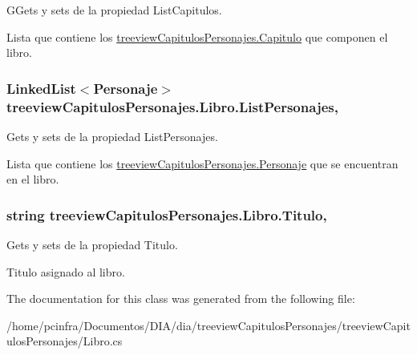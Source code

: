 G\-Gets y sets de la propiedad List\-Capitulos. 

Lista que contiene los \hyperlink{classtreeview_capitulos_personajes_1_1_capitulo}{treeview\-Capitulos\-Personajes.\-Capitulo} que componen el libro. \hypertarget{classtreeview_capitulos_personajes_1_1_libro_a91c18a348c246d5133e9f66df0d81c55}{
\subsubsection[{List\-Personajes}]{\setlength{\rightskip}{0pt plus 5cm}Linked\-List$<${\bf Personaje}$>$ treeview\-Capitulos\-Personajes.\-Libro.\-List\-Personajes\hspace{0.3cm}{\ttfamily [get]}, {\ttfamily [set]}}}\label{classtreeview_capitulos_personajes_1_1_libro_a91c18a348c246d5133e9f66df0d81c55}


Gets y sets de la propiedad List\-Personajes. 

Lista que contiene los \hyperlink{classtreeview_capitulos_personajes_1_1_personaje}{treeview\-Capitulos\-Personajes.\-Personaje} que se encuentran en el libro. \hypertarget{classtreeview_capitulos_personajes_1_1_libro_ae0bb4555199a6abc7138480292e16548}{
\subsubsection[{Titulo}]{\setlength{\rightskip}{0pt plus 5cm}string treeview\-Capitulos\-Personajes.\-Libro.\-Titulo\hspace{0.3cm}{\ttfamily [get]}, {\ttfamily [set]}}}\label{classtreeview_capitulos_personajes_1_1_libro_ae0bb4555199a6abc7138480292e16548}


Gets y sets de la propiedad Titulo. 

Titulo asignado al libro. 

The documentation for this class was generated from the following file\-:\begin{DoxyCompactItemize}
\item 
/home/pcinfra/\-Documentos/\-D\-I\-A/dia/treeview\-Capitulos\-Personajes/treeview\-Capitulos\-Personajes/Libro.\-cs\end{DoxyCompactItemize}
